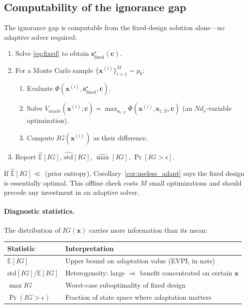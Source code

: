 \documentclass[11pt,a4paper]{article}
\newcommand{\E}{\mathbb{E}}
\begin{document}
\subsection{Computability of the ignorance gap}

The ignorance gap is computable from the fixed-design solution alone---no adaptive solver required:
\begin{enumerate}[nosep]
  \item Solve \eqref{eq:fixed} to obtain $\bm{s}^\star_{\mathrm{fixed}}(\bm{c})$.
  \item For a Monte Carlo sample $\{\bm{x}^{(i)}\}_{i=1}^M \sim p_0$:
  \begin{enumerate}[nosep]
    \item Evaluate $\Phi(\bm{x}^{(i)}, \bm{s}^\star_{\mathrm{fixed}}, \bm{c})$.
    \item Solve $V_{\mathrm{oracle}}(\bm{x}^{(i)}; \bm{c}) = \max_{\bm{s}_{1:N}} \Phi(\bm{x}^{(i)}, \bm{s}_{1:N}, \bm{c})$ (an $N d_s$-variable optimization).
    \item Compute $IG(\bm{x}^{(i)})$ as their difference.
  \end{enumerate}
  \item Report $\widehat{\E}[IG]$, $\widehat{\mathrm{std}}[IG]$, $\widehat{\max}[IG]$, $\Pr[IG > \epsilon]$.
\end{enumerate}
If $\widehat{\E}[IG] \ll $ (prior entropy), Corollary~\ref{cor:useless_adapt} says the fixed design is essentially optimal.  This offline check costs $M$ small optimizations and should precede any investment in an adaptive solver.

\paragraph{Diagnostic statistics.}
The distribution of $IG(\bm{x})$ carries more information than its mean:
\begin{center}
\begin{tabular}{@{}ll@{}}
\toprule
Statistic & Interpretation \\
\midrule
$\E[IG]$ & Upper bound on adaptation value (EVPI, in nats) \\
$\mathrm{std}[IG] / \E[IG]$ & Heterogeneity: large $\Rightarrow$ benefit concentrated on certain $\bm{x}$ \\
$\max IG$ & Worst-case suboptimality of fixed design \\
$\Pr(IG > \epsilon)$ & Fraction of state space where adaptation matters \\
\bottomrule
\end{tabular}
\end{center}
\end{document}
